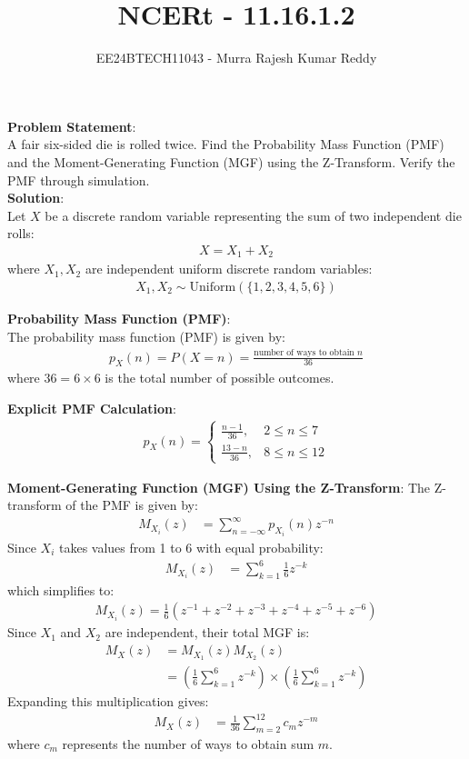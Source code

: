 \documentclass[journal]{IEEEtran}
\begin{document}
\title{NCERt - 11.16.1.2}
\author{EE24BTECH11043 - Murra Rajesh Kumar Reddy}
\maketitle

\textbf{Problem Statement}:\\
A fair six-sided die is rolled twice. Find the Probability Mass Function (PMF) and the Moment-Generating Function (MGF) using the Z-Transform. Verify the PMF through simulation.\\

\textbf{Solution}:\\
Let $X$ be a discrete random variable representing the sum of two independent die rolls:
\begin{align}
    X = X_1+X_2
\end{align}
where $X_1, X_2$ are independent uniform discrete random variables:
\begin{align}
    X_1, X_2 \sim \text{Uniform}(\{1,2,3,4,5,6\})
\end{align}

\textbf{Probability Mass Function (PMF)}:\\
The probability mass function (PMF) is given by:
\begin{align}
    p_X(n) = P(X = n) = \frac{\text{number of ways to obtain } n}{36}
\end{align}
where $36 = 6 \times 6$ is the total number of possible outcomes.

\textbf{Explicit PMF Calculation}:
\begin{align}
p_X(n) =
\begin{cases}
\frac{n-1}{36}, & 2 \le n \le 7 \\
\frac{13-n}{36}, & 8 \le n \le 12
\end{cases}
\end{align}

\textbf{Moment-Generating Function (MGF) Using the Z-Transform}:
The Z-transform of the PMF is given by:
\begin{align}
    M_{X_i}(z) &= \sum_{n=-\infty}^{\infty} p_{X_i}(n) z^{-n}
\end{align}
Since $X_i$ takes values from 1 to 6 with equal probability:
\begin{align}
    M_{X_i}(z) &= \sum_{k=1}^{6} \frac{1}{6} z^{-k}
\end{align}
which simplifies to:
\begin{align}
    M_{X_i}(z) = \frac{1}{6} \left( z^{-1} + z^{-2} + z^{-3} + z^{-4} + z^{-5} + z^{-6} \right)
\end{align}
Since $X_1$ and $X_2$ are independent, their total MGF is:
\begin{align}
    M_X(z) &= M_{X_1}(z) M_{X_2}(z) \\
    &= \left( \frac{1}{6} \sum_{k=1}^{6} z^{-k} \right) \times \left( \frac{1}{6} \sum_{k=1}^{6} z^{-k} \right)
\end{align}
Expanding this multiplication gives:
\begin{align}
    M_X(z) &= \frac{1}{36} \sum_{m=2}^{12} c_m z^{-m}
\end{align}
where $c_m$ represents the number of ways to obtain sum $m$.
\end{document}
